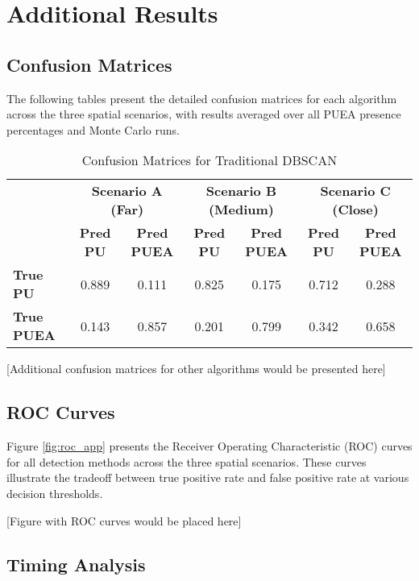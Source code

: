 \section{Additional Results}
\label{app:additional_results}

\subsection{Confusion Matrices}
\label{app:confusion_matrices}

The following tables present the detailed confusion matrices for each algorithm across the three spatial scenarios, with results averaged over all PUEA presence percentages and Monte Carlo runs.

\begin{table}[htbp]
\centering
\caption{Confusion Matrices for Traditional DBSCAN}
\label{tab:confusion_dbscan}
\begin{tabular}{@{}lcccccc@{}}
\toprule
& \multicolumn{2}{c}{\textbf{Scenario A (Far)}} & \multicolumn{2}{c}{\textbf{Scenario B (Medium)}} & \multicolumn{2}{c}{\textbf{Scenario C (Close)}} \\
\cmidrule(lr){2-3} \cmidrule(lr){4-5} \cmidrule(lr){6-7}
& \textbf{Pred PU} & \textbf{Pred PUEA} & \textbf{Pred PU} & \textbf{Pred PUEA} & \textbf{Pred PU} & \textbf{Pred PUEA} \\
\midrule
\textbf{True PU} & 0.889 & 0.111 & 0.825 & 0.175 & 0.712 & 0.288 \\
\textbf{True PUEA} & 0.143 & 0.857 & 0.201 & 0.799 & 0.342 & 0.658 \\
\bottomrule
\end{tabular}
\end{table}

[Additional confusion matrices for other algorithms would be presented here]

\subsection{ROC Curves}
\label{app:roc_curves}

Figure \ref{fig:roc_app} presents the Receiver Operating Characteristic (ROC) curves for all detection methods across the three spatial scenarios. These curves illustrate the tradeoff between true positive rate and false positive rate at various decision thresholds.

[Figure with ROC curves would be placed here]

\subsection{Timing Analysis}
\label{app:timing}

